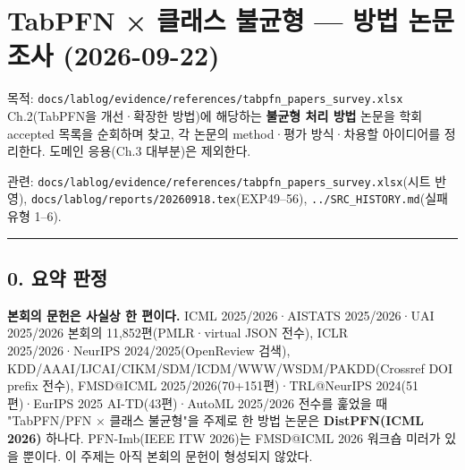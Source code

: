 \section{TabPFN × 클래스 불균형 — 방법 논문 조사 (2026-09-22)}
목적: \texttt{docs/\allowbreak{}\allowbreak{}lab\allowbreak{}log/\allowbreak{}\allowbreak{}evid\allowbreak{}ence/\allowbreak{}\allowbreak{}ref\allowbreak{}erences/\allowbreak{}\allowbreak{}tabpfn\_\allowbreak{}\allowbreak{}p\allowbreak{}apers\_\allowbreak{}\allowbreak{}su\allowbreak{}rvey.\allowbreak{}xls\allowbreak{}x} Ch.2(TabPFN을 개선·확장한 방법)에 해당하는 \textbf{불균형 처리 방법} 논문을 학회 accepted 목록을 순회하며 찾고, 각 논문의 method·평가 방식·차용할 아이디어를 정리한다. 도메인 응용(Ch.3 대부분)은 제외한다.

관련: \texttt{docs/\allowbreak{}\allowbreak{}lab\allowbreak{}log/\allowbreak{}\allowbreak{}evid\allowbreak{}ence/\allowbreak{}\allowbreak{}ref\allowbreak{}erences/\allowbreak{}\allowbreak{}tabpfn\_\allowbreak{}\allowbreak{}p\allowbreak{}apers\_\allowbreak{}\allowbreak{}su\allowbreak{}rvey.\allowbreak{}xls\allowbreak{}x}(시트 반영), \texttt{docs/\allowbreak{}\allowbreak{}lab\allowbreak{}log/\allowbreak{}\allowbreak{}repo\allowbreak{}rts/\allowbreak{}\allowbreak{}2026\allowbreak{}0918.\allowbreak{}tex\allowbreak{}}(EXP49–56), \texttt{.\allowbreak{}.\allowbreak{}/\allowbreak{}\allowbreak{}SRC\_\allowbreak{}\allowbreak{}H\allowbreak{}ISTORY.\allowbreak{}m\allowbreak{}d}(실패 유형 1–6).


\medskip\hrule\medskip
\subsection{0. 요약 판정}
\par\noindent \textbullet\enspace \textbf{본회의 문헌은 사실상 한 편이다.} ICML 2025/\allowbreak{}2026·AISTATS 2025/\allowbreak{}2026·UAI 2025/\allowbreak{}2026 본회의 11,852편(PMLR·virtual JSON 전수), ICLR 2025/\allowbreak{}2026·NeurIPS 2024/\allowbreak{}2025(OpenReview 검색), KDD/\allowbreak{}AAAI/\allowbreak{}IJCAI/\allowbreak{}CIKM/\allowbreak{}SDM/\allowbreak{}ICDM/\allowbreak{}WWW/\allowbreak{}WSDM/\allowbreak{}PAKDD(Crossref DOI prefix 전수), FMSD@ICML 2025/\allowbreak{}2026(70+\allowbreak{}151편)·TRL@NeurIPS 2024(51편)·EurIPS 2025 AI-TD(43편)·AutoML 2025/\allowbreak{}2026 전수를 훑었을 때 "TabPFN/\allowbreak{}PFN × 클래스 불균형"을 주제로 한 방법 논문은 \textbf{DistPFN(ICML 2026)} 하나다. PFN-Imb(IEEE ITW 2026)는 FMSD@ICML 2026 워크숍 미러가 있을 뿐이다. 이 주제는 아직 본회의 문헌이 형성되지 않았다.


